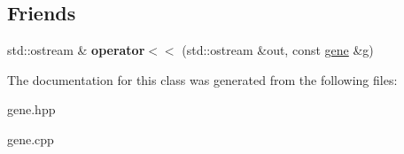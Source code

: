 \subsection*{\-Friends}
\begin{DoxyCompactItemize}
\item 
\hypertarget{classgene_a76e06d21ac5eb82429393eb4d54681b7}{std\-::ostream \& {\bfseries operator$<$$<$} (std\-::ostream \&out, const \hyperlink{classgene}{gene} \&g)}\label{classgene_a76e06d21ac5eb82429393eb4d54681b7}

\end{DoxyCompactItemize}


\-The documentation for this class was generated from the following files\-:\begin{DoxyCompactItemize}
\item 
gene.\-hpp\item 
gene.\-cpp\end{DoxyCompactItemize}

